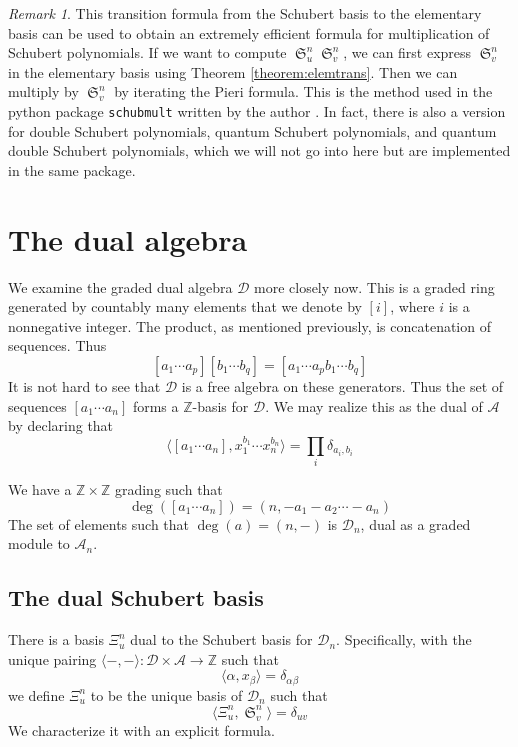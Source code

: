 \documentclass[a4paper,fleqn]{cas-sc}
\theoremstyle{definition}
\theoremstyle{remark}
\newtheorem*{remark}{Remark}
\numberwithin{equation}{subsection}
\DeclareMathOperator{\sch}{\mathfrak{S}}
\newcommand{\dsch}{\ensuremath{\Xi}}
\newcommand{\coma}{\mathcal{A}}
\newcommand{\dcoma}{\mathcal{D}}
\begin{document}
\begin{remark}
This transition formula from the Schubert basis to the elementary basis can be used to obtain an extremely efficient formula for multiplication of Schubert polynomials. If we want to compute $\sch_u^n\sch_v^n$, we can first express $\sch_v^n$ in the elementary basis using Theorem \ref{theorem:elemtrans}. Then we can multiply by $\sch_v^n$ by iterating the Pieri formula. This is the method used in the python package \verb|schubmult| written by the author \cite{schubmult}. In fact, there is also a version for double Schubert polynomials, quantum Schubert polynomials, and quantum double Schubert polynomials, which we will not go into here but are implemented in the same package.
\end{remark}




\section{The dual algebra}\label{section:dualalgebra}

We examine the graded dual algebra $\dcoma$ more closely now. This is a graded ring generated by countably many elements that we denote by $[i]$, where $i$ is a nonnegative integer. The product, as mentioned previously, is concatenation of sequences. Thus
$$[a_1\cdots a_p][b_1\cdots b_q]=[a_1\cdots a_pb_1\cdots b_q]$$
It is not hard to see that $\dcoma$ is a free algebra on these generators. Thus the set of sequences $[a_1\cdots a_n]$ forms a $\mathbb{Z}$-basis for $\dcoma$. We may realize this as the dual of $\coma$ by declaring that
$$\langle [a_1\cdots a_n],x_1^{b_1}\cdots x_n^{b_n}\rangle = \prod_i\delta_{a_i,b_i}$$

We have a $\mathbb{Z}\times \mathbb{Z}$ grading such that
$$\deg([a_1\cdots a_n])=(n,-a_1-a_2\cdots-a_n)$$
The set of elements such that $\deg(a) = (n,-)$ is $\dcoma_n$, dual as a graded module to $\coma_n$.

\subsection{The dual Schubert basis}
       
There is a basis $\dsch_u^{n}$ dual to the Schubert basis for $\dcoma_n$. Specifically, with the unique pairing $\langle -,-\rangle:\dcoma\times \coma\to\mathbb{Z}$ such that
$$\langle \alpha,x_\beta\rangle = \delta_{\alpha\beta}$$
we define $\dsch_u^n$ to be the unique basis of $\dcoma_n$ such that
$$\langle \dsch_u^n,\sch_v^n\rangle = \delta_{uv}$$
We characterize it with an explicit formula.
\end{document}
